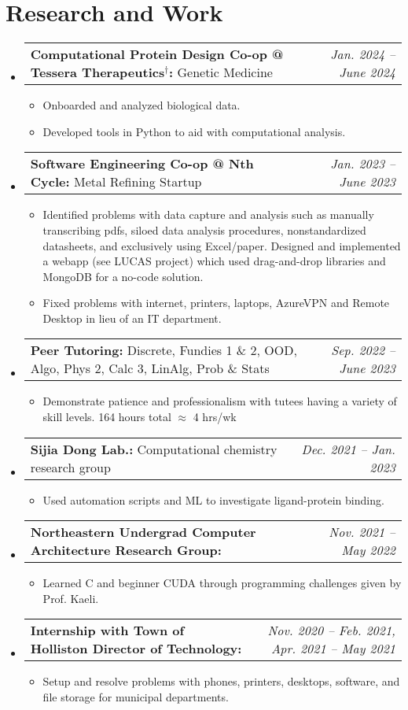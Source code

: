 \documentclass[letterpaper,11pt]{article}
\makeatletter
\newcommand{\resumeBullet}[1]{
  \item\small{
    #1 \vspace{-2pt}
  }
}
\newcommand{\resumeSubheadingThin}[3]{
  \vspace{-1pt}\item
    \begin{tabular*}{0.97\textwidth}[t]{l@{\extracolsep{\fill}}r}
      \small\textbf{#1:} #3 & \small\textit{#2} 
    \end{tabular*}\vspace{-7pt}
}
\newcommand{\resumeSubHeadingListStart}{\begin{itemize}[leftmargin=*]}
\newcommand{\resumeSubHeadingListEnd}{\end{itemize}}
\newcommand{\resumeItemListStart}{\begin{itemize}}
\newcommand{\resumeItemListEnd}{\end{itemize}\vspace{-5pt}}
\makeatother
\begin{document}
  \section{Research and Work \small{}}
  \resumeSubHeadingListStart
  \resumeSubheadingThin{Computational Protein Design Co-op @ Tessera Therapeutics$^\dag$}{Jan. 2024 -- June 2024}{Genetic Medicine}
  \resumeItemListStart
  \resumeBullet{Onboarded and analyzed biological data.}
  \resumeBullet{Developed tools in Python to aid with computational analysis.}
  \resumeItemListEnd
  \resumeSubheadingThin{Software Engineering Co-op @ Nth Cycle}{Jan. 2023 -- June 2023}{Metal Refining Startup}
  \resumeItemListStart
  \resumeBullet{Identified problems with data capture and analysis such as manually transcribing pdfs, siloed data analysis procedures, nonstandardized datasheets, and exclusively using Excel/paper. Designed and implemented a webapp (see LUCAS project) which used drag-and-drop libraries and MongoDB for a no-code solution. }
  \resumeBullet{Fixed problems with internet, printers, laptops, AzureVPN and Remote Desktop in lieu of an IT department.}
  \resumeItemListEnd
  \resumeSubheadingThin{Peer Tutoring\normalfont{*}}{Sep. 2022 -- June 2023}{Discrete, Fundies 1 \& 2, OOD, Algo, Phys 2, Calc 3, LinAlg, Prob \& Stats}
  \resumeItemListStart
    \resumeBullet{Demonstrate patience and professionalism with tutees having a variety of skill levels. 164 hours total $\approx$ 4 hrs/wk}
  \resumeItemListEnd
  \resumeSubheadingThin{Sijia Dong Lab.\normalfont{*}}{Dec. 2021 -- Jan. 2023}{Computational
  chemistry research group} \resumeItemListStart \resumeBullet{Used automation scripts and ML to investigate ligand-protein binding.}
\resumeItemListEnd
  \resumeSubheadingThin{Northeastern Undergrad Computer Architecture Research Group\normalfont{*}}{Nov. 2021 -- May 2022}{} \resumeItemListStart \resumeBullet{Learned C and beginner CUDA through programming challenges given by Prof. Kaeli.}
  \resumeItemListEnd
  \resumeSubheadingThin{Internship with Town of Holliston Director of Technology\normalfont{*}}{Nov. 2020 -- Feb. 2021, Apr. 2021 -- May 2021}{}
  \resumeItemListStart
    \resumeBullet{Setup and resolve problems with phones, printers, desktops, software, and file storage for municipal departments.}
  \resumeItemListEnd \resumeSubHeadingListEnd
\end{document}
